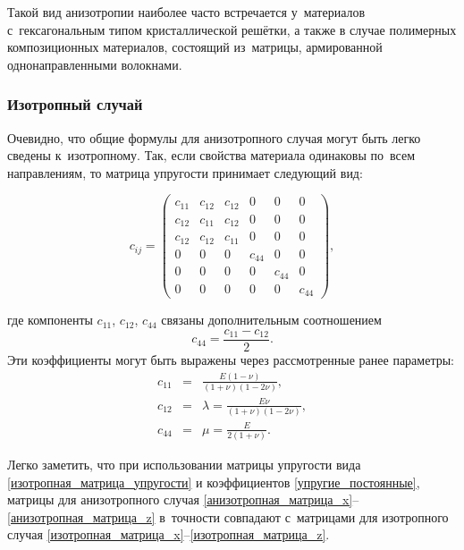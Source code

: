 \documentclass[thesis.tex]{subfiles}
\begin{document}
Такой вид анизотропии наиболее часто встречается у~материалов с~гексагональным типом кристаллической решётки, а также в
случае полимерных композиционных материалов, состоящий из~матрицы, армированной однонаправленными волокнами.

\subsubsection{Изотропный случай}

Очевидно, что общие формулы для анизотропного случая могут быть легко сведены к~изотропному. Так, если свойства
материала одинаковы по~всем направлениям, то матрица упругости принимает \cite{реслер2011механическое} следующий вид:
\begin{small}
\begin{equation}
    \label{изотропная_матрица_упругости}
    c_{ij} = \begin{pmatrix}
    c_{11} & c_{12} & c_{12} & 0 & 0 & 0 \\
    c_{12} & c_{11} & c_{12} & 0 & 0 & 0 \\
    c_{12} & c_{12} & c_{11} & 0 & 0 & 0 \\
    0 & 0 & 0 & c_{44} & 0 & 0 \\
    0 & 0 & 0 & 0 & c_{44} & 0 \\
    0 & 0 & 0 & 0 & 0 & c_{44}
    \end{pmatrix},
\end{equation}
\end{small}
где компоненты $c_{11}$, $c_{12}$, $c_{44}$ связаны дополнительным соотношением
\[
    c_{44} = \frac{c_{11} - c_{12}}{2}.
\]
Эти коэффициенты могут быть выражены через рассмотренные ранее параметры:
\begin{eqnarray}
    \label{упругие_постоянные}
    c_{11} &=&  \frac{E(1-\nu)}{(1+\nu)(1-2\nu)}, \nonumber \\
    c_{12} &=&  \lambda =  \frac{E\nu}{(1+\nu)(1-2\nu)}, \\
    c_{44} &=&  \mu = \frac{E}{2(1+\nu)}. \nonumber
\end{eqnarray}

Легко заметить, что при использовании матрицы упругости вида \eqref{изотропная_матрица_упругости} и коэффициентов
\eqref{упругие_постоянные}, матрицы для анизотропного случая \eqref{анизотропная_матрица_x}--\eqref{анизотропная_матрица_z}
в~точности совпадают с~матрицами для изотропного случая \eqref{изотропная_матрица_x}--\eqref{изотропная_матрица_z}.
\end{document}
